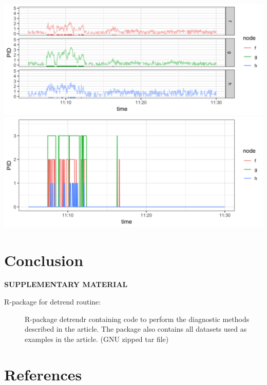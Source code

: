 \documentclass[12pt]{article}
\begin{document}
		
	
	\includegraphics[width = \linewidth]{Figures/corrected_rugplot.png}
	\includegraphics[width = \linewidth]{Figures/signal_plot.png}
	
	\section{Conclusion}
	\label{sec:conc}
	
	
	\bigskip
	\begin{center}
		{\large\bf SUPPLEMENTARY MATERIAL}
	\end{center}
	
	\begin{description}
		
		\item[R-package for detrend routine:] R-package detrendr containing code to perform the diagnostic methods described in the article. The package also contains all datasets used as examples in the article. (GNU zipped tar file)
				
	\end{description}
	
	\section{References}

	
	
	
	
\end{document}
